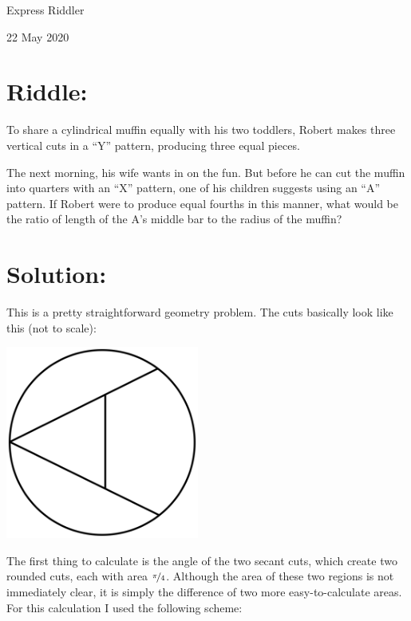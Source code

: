 \documentclass{article}
\begin{document}
\pagestyle{empty} %

\begin{center}
{\LARGE Express Riddler}

\vspace{0.15in}

{\Large 22 May 2020}
\end{center}


\section*{Riddle:}

To share a cylindrical muffin equally with his two toddlers, Robert makes three vertical cuts in a ``Y'' pattern, producing three equal pieces.

The next morning, his wife wants in on the fun. But before he can cut the muffin into quarters with an ``X'' pattern, one of his children suggests using an ``A'' pattern.
If Robert were to produce equal fourths in this manner, what would be the ratio of length of the A's middle bar to the radius of the muffin?

\section*{Solution:}

This is a pretty straightforward geometry problem.
The cuts basically look like this (not to scale):

\vspace{0.1in}
\begin{center}
\includegraphics[width=2.5in]{A_cut.png}
\end{center}
\vspace{0.1in}

The first thing to calculate is the angle of the two secant cuts, which create two rounded cuts, each with area $\nicefrac{\pi}{4}$.
Although the area of these two regions is not immediately clear, it is simply the difference of two more easy-to-calculate areas.
For this calculation I used the following scheme:
\end{document}
